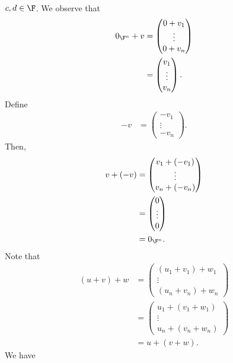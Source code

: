 \documentclass[10pt]{mypackage}
\begin{document}
\begin{example}[$\F^{n}$]
\begin{align*}
  \end{align*}
  $c,d\in \F$. We observe that
  \begin{align*}
    0_{\F^n} + v &= \begin{pmatrix}0 + v_1\\\vdots\\0 + v_n\end{pmatrix}\\
                 &= \begin{pmatrix}v_1\\\vdots\\v_n\end{pmatrix}.
  \end{align*}
  Define
  \begin{align*}
    -v &= \begin{pmatrix}-v_1\\\vdots\\-v_n\end{pmatrix}.
  \end{align*}
  Then,
  \begin{align*}
    v + (-v) &= \begin{pmatrix}v_1 + \left(-v_1\right)\\\vdots\\v_n + \left(-v_n\right)\end{pmatrix}\\
             &= \begin{pmatrix}0\\\vdots\\0\end{pmatrix}\\
             &= 0_{\F^n}.
  \end{align*}
  Note that
  \begin{align*}
    (u + v) + w &= \begin{pmatrix}\left(u_1 + v_1\right) + w_1 \\\vdots\\\left(u_n + v_n\right) + w_n\end{pmatrix}\\
                &= \begin{pmatrix}u_1 + \left(v_1 + w_1\right) \\\vdots\\u_n + \left(v_n + w_n\right)\end{pmatrix}\\
                &= u + (v+w).
  \end{align*}
  We have
  \begin{align*}

\end{align*}
\end{example}
\end{document}

